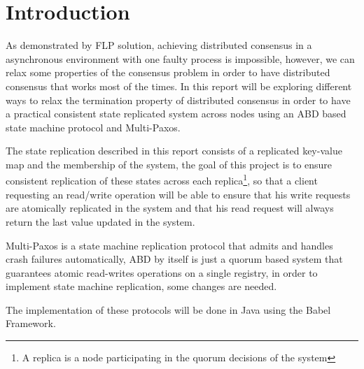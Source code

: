 \documentclass[10pt,a4paper,twocolumn]{article}
\title{\titulo}
\date{\data}
\author{\name\\ \institution\\ {\small (Based on notes produced by João Leitão)}}
\begin{document}

\maketitle

\begin{abstract}
	In the world of distributed systems, ensuring consistent replication among machines is crucial to achieve better performance, scalability and fault tolerance, this replication is also known as state machine replication (SMR). There are multiple ways to solve SMR, in this report will be discussing an ABD based SMR implementation and Multi-Paxos. The goal of the report is to explore each of these approaches, point out their benefits and drawbacks. Identifying these tradeoffs is crucial for the development of robust and efficient systems that are adequate to solve a specific problem.
\end{abstract}

\section{Introduction}
\label{sec:intro}
As demonstrated by FLP\cite{FLP} solution, achieving distributed consensus in a asynchronous environment with one faulty process is impossible, however, we can relax some properties of the consensus problem in order to have distributed consensus that works most of the times. In this report will be exploring different ways to relax the termination property of distributed consensus in order to have a practical consistent state replicated system across nodes using an ABD\cite{abd} based state machine protocol and Multi-Paxos\cite{multipaxos}.
\par The state replication described in this report consists of a replicated key-value map and the membership of the system, the goal of this project is to ensure consistent replication of these states across each replica\footnote{A replica is a node participating in the quorum decisions of the system}, so that a client requesting an read/write operation will be able to ensure that his write requests are atomically replicated in the system and that his read request will always return the last value updated in the system.
\par Multi-Paxos is a state machine replication protocol that admits and handles crash failures automatically, ABD by itself is just a quorum based system that guarantees atomic read-writes operations on a single registry, in order to implement state machine replication, some changes are needed.
\par The implementation of these protocols will be done in Java using the Babel Framework\cite{babelfmwk}.
\end{document}
